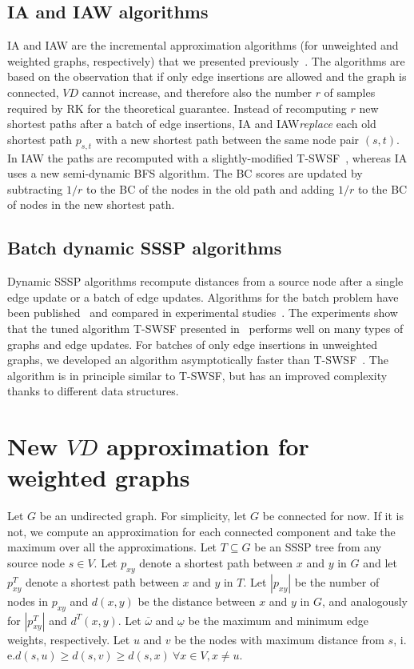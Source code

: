 \documentclass[english]{llncs}
\newcommand{\ie}{i.\,e.\xspace}
\newcommand{\vd}{$\mathit{VD}$\xspace}
\newcommand{\rk}{\textsf{RK}\xspace}
\newcommand{\ia}{\textsf{IA}\xspace}
\newcommand{\iaw}{\textsf{IAW}\xspace}
\begin{document}
\subsection{\textsf{IA} and \textsf{IAW} algorithms}
\label{sec:bms}
\ia and \iaw are the incremental approximation algorithms (for unweighted and weighted graphs, respectively) that we presented previously~\cite{DBLP:conf/alenex/BergaminiMS15}. The algorithms are based on the observation that if only edge insertions are allowed and the graph is connected, \vd cannot increase, and therefore also the number $r$ of samples required by \rk for the theoretical guarantee. Instead of recomputing $r$ new shortest paths after a batch of edge insertions, \ia and \iaw \textit{replace} each old shortest path $p_{s,t}$ with a new shortest path between the same node pair $(s,t)$. In \iaw the paths are recomputed with a slightly-modified \textsf{T-SWSF}~\cite{DBLP:conf/wea/BauerW09}, whereas \ia uses a new semi-dynamic BFS algorithm.
The BC scores are updated by subtracting $1/r$ to the BC of the nodes in the old path and adding $1/r$ to the BC of nodes in the new shortest path.

\subsection {Batch dynamic SSSP algorithms}
\label{sssp_update}
Dynamic SSSP algorithms recompute distances from a source node after a single edge update or a batch of edge updates.
Algorithms for the batch problem have been published~\cite{Ramalingam92anincremental,Frigioni_semi-dynamicalgorithms,DBLP:conf/wea/BauerW09} and compared in experimental studies~\cite{DBLP:conf/wea/BauerW09,DBLP:conf/wea/DAndreaDFLP14}.
The experiments show that the tuned algorithm \textsf{T-SWSF} presented in~\cite{DBLP:conf/wea/BauerW09} performs well on many types of graphs and edge updates. For batches of only edge insertions in unweighted graphs, we developed an algorithm asymptotically faster than \textsf{T-SWSF}~\cite{DBLP:conf/alenex/BergaminiMS15}. The algorithm is in principle similar to \textsf{T-SWSF}, but has an improved complexity thanks to different data structures.


\section{New \vd approximation for weighted graphs}
\label{sec:new_vd_approx}
Let $G$ be an undirected graph. For simplicity, let $G$ be connected for now. If it is not, we compute an approximation for each connected component and take the maximum over all the approximations. Let $T \subseteq G$ be an SSSP tree from any source node $s \in V$. Let $p_{xy}$ denote a shortest path between $x$ and $y$ in $G$ and let $p_{xy}^T$ denote a shortest path between $x$ and $y$ in $T$. Let $|p_{xy}|$ be the number of nodes in $p_{xy}$ and $d(x,y)$ be the distance between $x$ and $y$ in $G$, and analogously for $|p_{xy}^T|$ and $d^T(x,y)$. Let $\overline{\omega}$ and  $\underline{\omega}$ be the maximum and minimum edge weights, respectively. Let $u$ and $v$ be the nodes with maximum distance from $s$, \ie $d(s, u)\geq d(s,v) \geq d(s, x)\  \forall x\in V, x\neq u $. 
\end{document}

